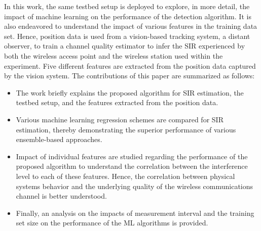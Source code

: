     In this work, the same testbed setup is deployed to explore, in more detail, the impact of machine learning on the performance of the detection algorithm.  It is also endeavored to understand the impact of various features in the training data set. Hence, position data is used from a vision-based tracking system, a distant observer, to train a channel quality estimator to infer the SIR experienced by both the wireless access point and the wireless station used within the experiment. Five different features are extracted from the position data captured by the vision system. The contributions of this paper are summarized as follows:
    \begin{itemize}
        \item The work briefly explains the proposed algorithm for SIR estimation, the testbed setup, and the features extracted from the position data.
        \item Various machine learning regression schemes are compared for SIR estimation, thereby demonstrating the superior performance of various ensemble-based approaches.
        \item Impact of individual features are studied regarding the performance of the proposed algorithm to understand the correlation between the interference level to each of these features. Hence, the correlation between physical systems behavior and the underlying quality of the wireless communications channel is better understood. 
        \item Finally, an analysis on the impacts of measurement interval and the training set size on the performance of the ML algorithms is provided.
    \end{itemize}
    
